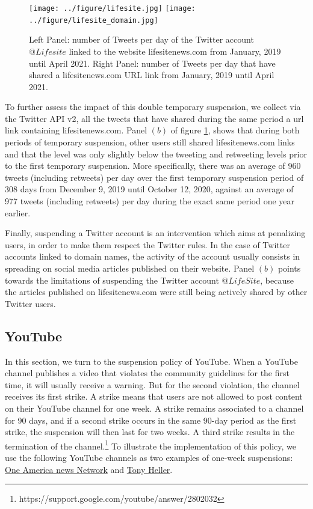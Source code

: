 \documentclass{article}
\begin{document}
\begin{figure}[h]
\hspace{-2em}
		\texttt{[image: ../figure/lifesite.jpg]} 
		\texttt{[image: ../figure/lifesite\_domain.jpg]}
\caption{Left Panel: number of Tweets per day of the Twitter account $@Lifesite$ linked to the website lifesitenews.com from January, 2019 until April 2021. Right Panel: number of Tweets per day that have shared a lifesitenews.com URL link from January, 2019 until April 2021. }
\label{fig2}
\end{figure}

To further assess the impact of this double temporary suspension, we collect via the Twitter API v2, all the tweets that have shared during the same period a url link containing lifesitenews.com. Panel $(b)$ of figure \ref{fig2}, shows that during both periods of temporary suspension, other users still shared lifesitenews.com links and that the level was only slightly below the tweeting and retweeting levels prior to the first temporary suspension. More specifically, there was an average of 960 tweets (including retweets) per day over the first temporary suspension period of 308 days from December 9, 2019 until October 12, 2020, against an average of 977 tweets (including retweets) per day during the exact same period one year earlier. 

Finally, suspending a Twitter account is an intervention which aims at penalizing users, in order to make them respect the Twitter rules. In the case of Twitter accounts linked to domain names, the activity of the account usually consists in spreading on social media articles published on their website. Panel $(b)$ points towards the limitations of suspending the Twitter account $@LifeSite$, because the 
articles published on lifesitenews.com were still being actively shared by other Twitter users.

\subsection{YouTube}

In this section, we turn to the suspension policy of YouTube. 
When a YouTube channel publishes a video that violates the community guidelines for the first time, it will usually receive a warning. 
But for the second violation, the channel receives its first strike.
A strike means that users are not allowed to post content on their YouTube channel for one week.
A strike remains associated to a channel for 90 days, and if a second strike occurs in the same 90-day period as the first strike, the suspension will then last for two weeks.
A third strike results in the termination of the channel.\footnote{https://support.google.com/youtube/answer/2802032}
To illustrate the implementation of this policy, we use the following YouTube channels as two examples of  one-week suspensions: \href{https://www.youtube.com/channel/UCNbIDJNNgaRrXOD7VllIMRQ}{One America news Network} and \href{https://www.youtube.com/user/TonyHeller1}{Tony Heller}.
\end{document}
